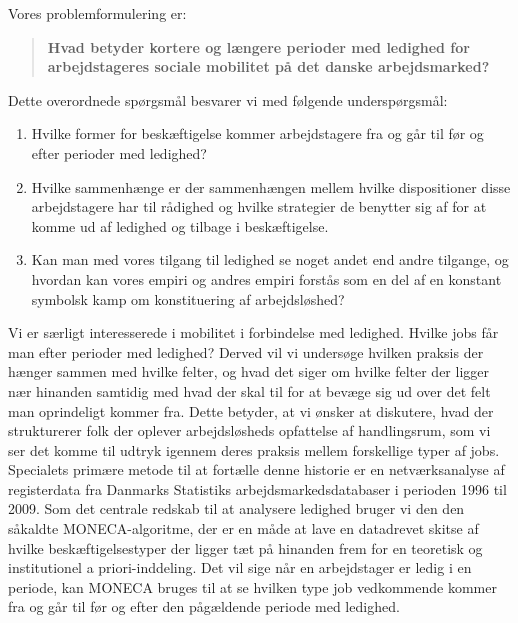 Vores problemformulering er:
\begin{quote} %
  \textbf{Hvad betyder kortere og længere perioder med ledighed for arbejdstageres sociale mobilitet på det danske arbejdsmarked?}%
\end{quote}
%
Dette overordnede spørgsmål besvarer vi med følgende underspørgsmål:
%
 \begin{enumerate}
   \item Hvilke former for beskæftigelse kommer arbejdstagere fra og går til før og efter perioder med ledighed?
   \item Hvilke sammenhænge er der sammenhængen mellem hvilke dispositioner disse arbejdstagere har til rådighed og hvilke strategier de benytter sig af for at komme ud af ledighed og tilbage i beskæftigelse.
   \item Kan man med vores tilgang til ledighed se noget andet end andre tilgange, og hvordan kan vores empiri og andres empiri forstås som en del af en konstant symbolsk kamp om konstituering af arbejdsløshed?
 \end{enumerate}
%
Vi er særligt interesserede i mobilitet i forbindelse med ledighed. Hvilke jobs får man efter perioder med ledighed? Derved vil vi undersøge hvilken praksis der hænger sammen med hvilke felter, og hvad det siger om hvilke felter der ligger nær hinanden samtidig med hvad der skal til for at bevæge sig ud over det felt man oprindeligt kommer fra. Dette betyder, at vi ønsker at diskutere, hvad der strukturerer folk der oplever arbejdsløsheds opfattelse af handlingsrum, som vi ser det komme til udtryk igennem deres praksis mellem forskellige typer af jobs. Specialets primære metode til at fortælle denne historie er en netværksanalyse af registerdata fra Danmarks Statistiks arbejdsmarkedsdatabaser i perioden 1996 til 2009. Som det centrale redskab til at analysere ledighed bruger vi den den såkaldte MONECA-algoritme, der er en måde at lave en datadrevet skitse af hvilke beskæftigelsestyper der ligger tæt på hinanden frem for en teoretisk og institutionel a priori-inddeling. Det vil sige når en arbejdstager er ledig i en periode, kan MONECA bruges til at se hvilken type job vedkommende kommer fra og går til før og efter den pågældende periode med ledighed.

